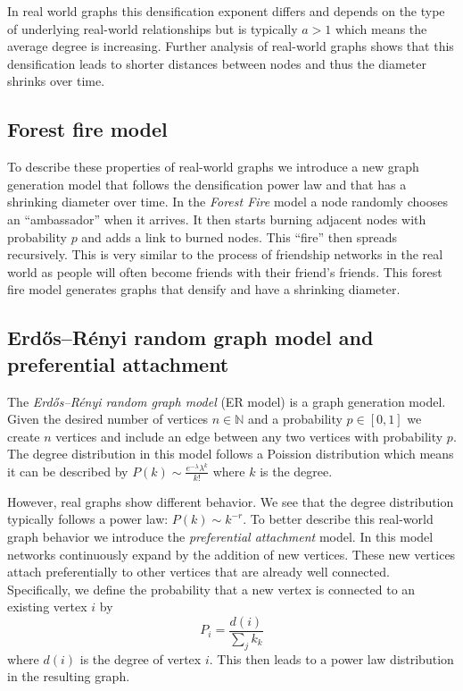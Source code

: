 In real world graphs this densification exponent differs and depends on the type of underlying real-world relationships but is typically $a > 1$ which means the average degree is increasing. Further analysis of real-world graphs shows that this densification leads to shorter distances between nodes and thus the diameter shrinks over time.

\subsection{Forest fire model}
\bigskip

To describe these properties of real-world graphs we introduce a new graph generation model that follows the densification power law and that has a shrinking diameter over time. In the \emph{Forest Fire} model a node randomly chooses an ``ambassador'' when it arrives. It then starts burning adjacent nodes with probability $p$ and adds a link to burned nodes. This ``fire'' then spreads recursively. This is very similar to the process of friendship networks in the real world as people will often become friends with their friend's friends. This forest fire model generates graphs that densify and have a shrinking diameter.

\subsection{Erdős–Rényi random graph model and preferential attachment}
\bigskip

The \emph{Erdős–Rényi random graph model} (ER model) is a graph generation model. Given the desired number of vertices $n \in \mathbb{N}$ and a probability $p \in [0,1]$ we create $n$ vertices and include an edge between any two vertices with probability $p$. The degree distribution in this model follows a Poission distribution which means it can be described by $P(k) \sim \frac{e^{-\lambda} \lambda^k}{k!}$ where $k$ is the degree.

However, real graphs show different behavior. We see that the degree distribution typically follows a power law: $P(k) \sim k^{-r}$. To better describe this real-world graph behavior we introduce the \emph{preferential attachment} model. In this model networks continuously expand by the addition of new vertices. These new vertices attach preferentially to other vertices that are already well connected. Specifically, we define the probability that a new vertex is connected to an existing vertex $i$ by $$
P_i = \frac{d(i)}{\sum_j k_k}
$$
where $d(i)$ is the degree of vertex $i$. This then leads to a power law distribution in the resulting graph.

